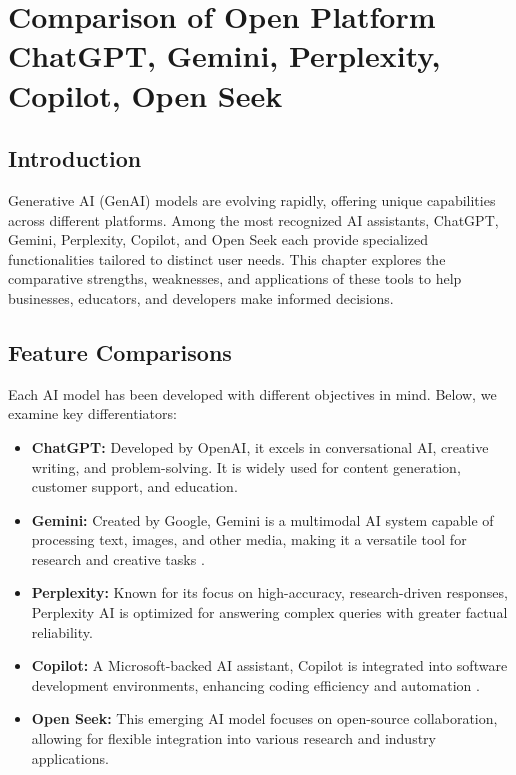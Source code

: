 \documentclass[a4paper,headinclude=on,footinclude=on,12pt,oneside]{scrbook}
\begin{document}

\chapter{Comparison of Open Platform ChatGPT, Gemini, Perplexity, Copilot, Open Seek}



\section{Introduction}

Generative AI (GenAI) models are evolving rapidly, offering unique capabilities across different platforms. Among the most recognized AI assistants, ChatGPT, Gemini, Perplexity, Copilot, and Open Seek each provide specialized functionalities tailored to distinct user needs. This chapter explores the comparative strengths, weaknesses, and applications of these tools to help businesses, educators, and developers make informed decisions.

\section{Feature Comparisons}

Each AI model has been developed with different objectives in mind. Below, we examine key differentiators:

\begin{itemize}
	\item \textbf{ChatGPT:} Developed by OpenAI, it excels in conversational AI, creative writing, and problem-solving. It is widely used for content generation, customer support, and education.
	\item \textbf{Gemini:} Created by Google, Gemini is a multimodal AI system capable of processing text, images, and other media, making it a versatile tool for research and creative tasks .
	\item \textbf{Perplexity:} Known for its focus on high-accuracy, research-driven responses, Perplexity AI is optimized for answering complex queries with greater factual reliability.
	\item \textbf{Copilot:} A Microsoft-backed AI assistant, Copilot is integrated into software development environments, enhancing coding efficiency and automation .
	\item \textbf{Open Seek:} This emerging AI model focuses on open-source collaboration, allowing for flexible integration into various research and industry applications.
\end{itemize}
\end{document}
